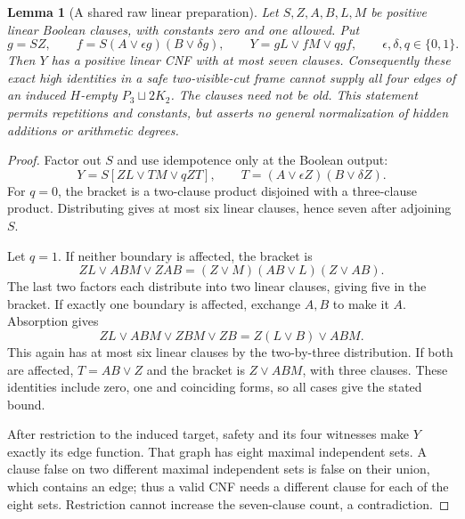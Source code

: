 \documentclass[11pt]{article}
\newtheorem{lemma}[theorem]{Lemma}
\theoremstyle{definition}
\theoremstyle{remark}
\begin{document}
\begin{lemma}[A shared raw linear preparation]\label{lem:rawlinearpreparation}
Let $S,Z,A,B,L,M$ be positive linear Boolean clauses, with constants zero and one allowed. Put
\[
 g=SZ,\qquad f=S(A\vee\epsilon g)(B\vee\delta g),\qquad
 Y=gL\vee fM\vee qgf,
 \qquad \epsilon,\delta,q\in\{0,1\}.
\]
Then $Y$ has a positive linear CNF with at most seven clauses. Consequently these exact high identities in a safe two-visible-cut frame cannot supply all four edges of an induced $H$-empty $P_3\sqcup2K_2$. The clauses need not be old. This statement permits repetitions and constants, but asserts no general normalization of hidden additions or arithmetic degrees.
\end{lemma}
\begin{proof}
Factor out $S$ and use idempotence only at the Boolean output:
\[
 Y=S[ZL\vee TM\vee qZT],\qquad
 T=(A\vee\epsilon Z)(B\vee\delta Z).
\]
For $q=0$, the bracket is a two-clause product disjoined with a three-clause product. Distributing gives at most six linear clauses, hence seven after adjoining $S$.

Let $q=1$. If neither boundary is affected, the bracket is
\[
 ZL\vee ABM\vee ZAB=(Z\vee M)(AB\vee L)(Z\vee AB).
\]
The last two factors each distribute into two linear clauses, giving five in the bracket. If exactly one boundary is affected, exchange $A,B$ to make it $A$. Absorption gives
\[
 ZL\vee ABM\vee ZBM\vee ZB=Z(L\vee B)\vee ABM.
\]
This again has at most six linear clauses by the two-by-three distribution. If both are affected, $T=AB\vee Z$ and the bracket is $Z\vee ABM$, with three clauses. These identities include zero, one and coinciding forms, so all cases give the stated bound.

After restriction to the induced target, safety and its four witnesses make $Y$ exactly its edge function. That graph has eight maximal independent sets. A clause false on two different maximal independent sets is false on their union, which contains an edge; thus a valid CNF needs a different clause for each of the eight sets. Restriction cannot increase the seven-clause count, a contradiction.
\end{proof}
\end{document}
